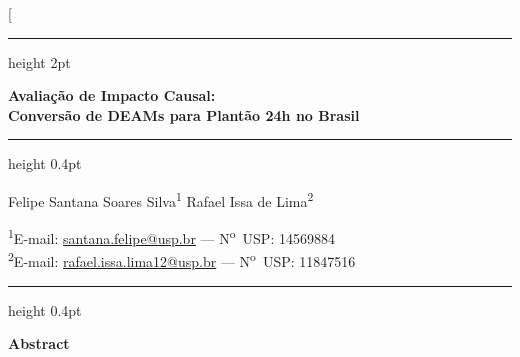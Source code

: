 \documentclass[twocolumn, 10pt]{article}
\begin{document}
\twocolumn[{%
\begin{@twocolumnfalse}

  \vspace*{0.3cm}
  \hrule height 2pt
  \vspace{0.5cm}

  {\sffamily\bfseries\LARGE
    Avaliação de Impacto Causal:\\[4pt]
    Conversão de DEAMs para Plantão 24h no Brasil}

  \vspace{0.5cm}
  \hrule height 0.4pt
  \vspace{0.4cm}

  {\sffamily\large
    Felipe Santana Soares Silva\textsuperscript{1} \quad
    Rafael Issa de Lima\textsuperscript{2}}

  \vspace{0.15cm}
  {\sffamily\small\color{gray}
    \textsuperscript{1}E-mail: \href{mailto:santana.felipe@usp.br}{santana.felipe@usp.br}
    — N\textsuperscript{o}~USP: 14569884\\
    \textsuperscript{2}E-mail: \href{mailto:rafael.issa.lima12@usp.br}{rafael.issa.lima12@usp.br}
    — N\textsuperscript{o}~USP: 11847516}

  \vspace{0.6cm}
  \hrule height 0.4pt
  \vspace{0.5cm}

  \begin{minipage}[t]{0.48\textwidth}
    {\sffamily\bfseries\small Abstract}


\end{minipage}
\end{@twocolumnfalse}}
\end{document}
